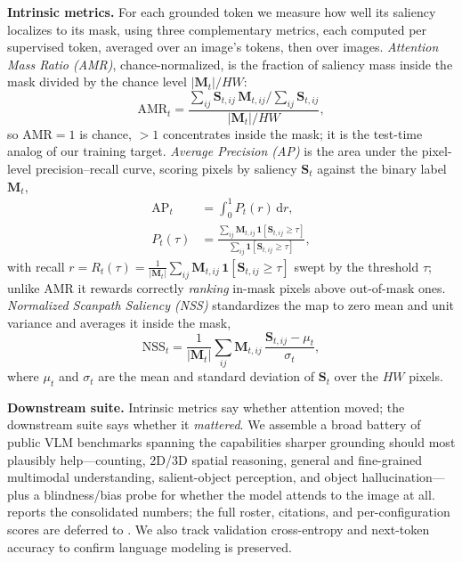 \textbf{Intrinsic metrics.} For each grounded token we measure how well its saliency localizes to its mask, using three complementary metrics, each computed per supervised token, averaged over an image's tokens, then over images.
\emph{Attention Mass Ratio (AMR)}, chance-normalized, is the fraction of saliency mass inside the mask divided by the chance level $|\mathbf{M}_t|/HW$:
\begin{equation}
\mathrm{AMR}_t
= \frac{\sum_{ij}\mathbf{S}_{t,ij}\,\mathbf{M}_{t,ij}\big/\sum_{ij}\mathbf{S}_{t,ij}}
       {|\mathbf{M}_t|/HW},
\end{equation}
so $\mathrm{AMR}=1$ is chance, ${>}1$ concentrates inside the mask; it is the test-time analog of our training target.
\emph{Average Precision (AP)} is the area under the pixel-level precision--recall curve, scoring pixels by saliency $\mathbf{S}_t$ against the binary label $\mathbf{M}_t$,
\begin{equation}
\begin{aligned}
\mathrm{AP}_t &= \int_0^1 P_t(r)\,\mathrm{d}r, \\
P_t(\tau) &= \frac{\sum_{ij}\mathbf{M}_{t,ij}\,\mathbf{1}[\mathbf{S}_{t,ij}\ge\tau]}
                  {\sum_{ij}\mathbf{1}[\mathbf{S}_{t,ij}\ge\tau]},
\end{aligned}
\end{equation}
with recall $r=R_t(\tau)=\tfrac{1}{|\mathbf{M}_t|}\sum_{ij}\mathbf{M}_{t,ij}\,\mathbf{1}[\mathbf{S}_{t,ij}\ge\tau]$ swept by the threshold $\tau$; unlike AMR it rewards correctly \emph{ranking} in-mask pixels above out-of-mask ones.
\emph{Normalized Scanpath Saliency (NSS)} standardizes the map to zero mean and unit variance and averages it inside the mask,
\begin{equation}
\mathrm{NSS}_t = \frac{1}{|\mathbf{M}_t|}\sum_{ij}\mathbf{M}_{t,ij}\,\frac{\mathbf{S}_{t,ij}-\mu_t}{\sigma_t},
\end{equation}
where $\mu_t$ and $\sigma_t$ are the mean and standard deviation of $\mathbf{S}_t$ over the $HW$ pixels.

\textbf{Downstream suite.} Intrinsic metrics say whether attention moved; the downstream suite says whether it \emph{mattered}. We assemble a broad battery of public VLM benchmarks spanning the capabilities sharper grounding should most plausibly help---counting, 2D/3D spatial reasoning, general and fine-grained multimodal understanding, salient-object perception, and object hallucination---plus a blindness/bias probe for whether the model attends to the image at all.  reports the consolidated numbers; the full roster, citations, and per-configuration scores are deferred to . We also track validation cross-entropy and next-token accuracy to confirm language modeling is preserved.
